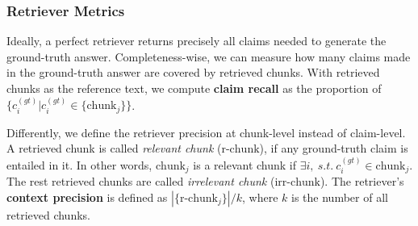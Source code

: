 

\subsubsection{Retriever Metrics}

Ideally, a perfect retriever returns precisely all claims needed to generate the ground-truth answer. Completeness-wise, we can measure how many claims made in the ground-truth answer are covered by retrieved chunks. With retrieved chunks as the reference text, we compute \textbf{claim recall} as the proportion of $\{c^{(gt)}_i | c^{(gt)}_i \in \{\text{chunk}_j\}\}$.

Differently, we define the retriever precision at chunk-level instead of claim-level. A retrieved chunk is called \textit{relevant chunk} ($\text{r-chunk}$), if any ground-truth claim is entailed in it. In other words, $\text{chunk}_j$ is a relevant chunk if $\exists i, ~s.t.~ c^{(gt)}_i\in \text{chunk}_j$. The rest retrieved chunks are called \textit{irrelevant chunk} ($\text{irr-chunk}$). The retriever's \textbf{context precision} is defined as $|\{\text{r-chunk}_j\}|/k$, where $k$ is the number of all retrieved chunks.

